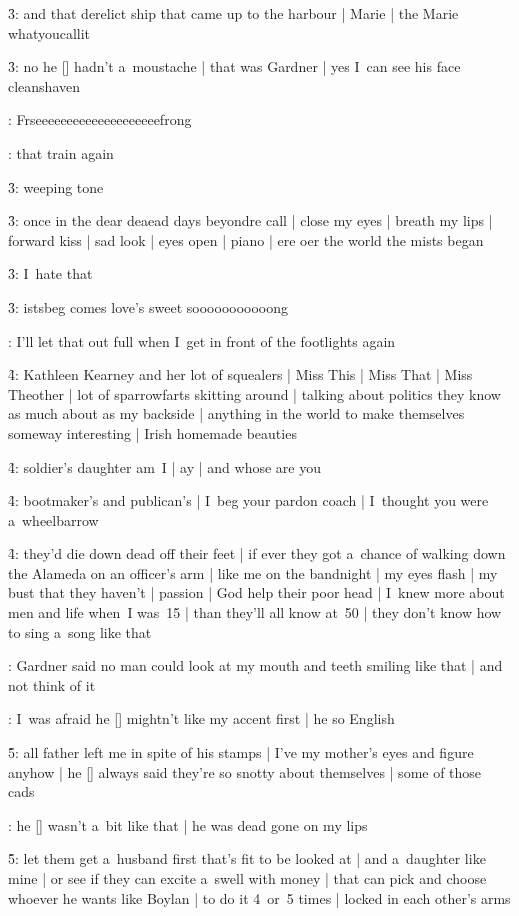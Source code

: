 \f3:
and that derelict ship that came up to the harbour |
Marie |
the Marie whatyoucallit

\f3:
no he [\mulvey] hadn't a~moustache |
that was Gardner |
yes I~can see his face cleanshaven

:
Frseeeeeeeeeeeeeeeeeeeefrong

:
that train again

\f3:
weeping tone

\f3:
once in the dear deaead days beyondre call |
close my eyes |
breath my lips |
forward kiss |
sad look |
eyes open |
piano |
ere oer the world the mists began

\f3:
I~hate that

\f3:
istsbeg comes love's sweet sooooooooooong

:
I'll let that out full when I~get in front of the footlights again

\f4:
Kathleen Kearney and her lot of squealers |
Miss This |
Miss That |
Miss Theother |
lot of sparrowfarts skitting around |
talking about politics they know as much about as my backside |
anything in the world to make themselves someway interesting |
Irish homemade beauties

\f4:
soldier's daughter am~I |
ay |
and whose are you

\f4:
bootmaker's and publican's |
I~beg your pardon coach |
I~thought you were a~wheelbarrow

\f4:
they'd die down dead off their feet |
if ever they got a~chance of walking down the Alameda on an officer's arm |
like me on the bandnight |
my eyes flash |
my bust that they haven't |
passion |
God help their poor head |
I~knew more about men and life when~I was~15 |
than they'll all know at~50 |
they don't know how to sing a~song like that

:
Gardner said no man could look at my mouth and teeth smiling like that |
and not think of it

:
I~was afraid he [\gardner] mightn't like my accent first |
he so English

\f5:
all father left me in spite of his stamps |
I've my mother's eyes and figure anyhow |
he [\father] always said they're so snotty about themselves |
some of those cads

:
he [\gardner] wasn't a~bit like that |
he was dead gone on my lips

\f5:
let them get a~husband first that's fit to be looked at |
and a~daughter like mine |
or see if they can excite a~swell with money |
that can pick and choose whoever he wants like Boylan |
to do it 4~or~5 times |
locked in each other's arms

